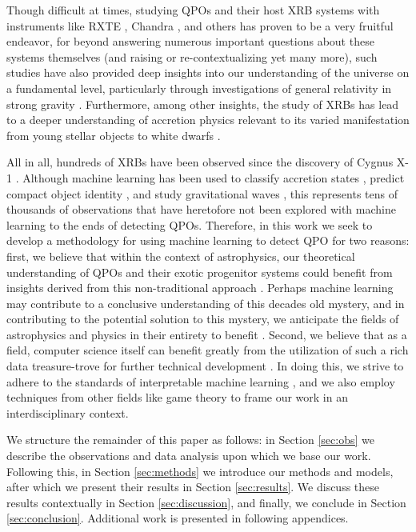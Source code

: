 \documentclass[fleqn,usenatbib]{mnras}
\begin{document}
Though difficult at times, studying QPOs and their host XRB systems with instruments like RXTE \citep{rxte1996}, Chandra \citep{Weisskopf2000}, and others has proven to be a very fruitful endeavor, for beyond answering numerous important questions about these systems themselves (and raising or re-contextualizing yet many more), such studies have also provided deep insights into our understanding of the universe on a fundamental level, particularly through investigations of general relativity in strong gravity \citep{strong_gravity_2004,strong_gravity_2017}. Furthermore, among other insights, the study of XRBs has lead to a deeper understanding of accretion physics relevant to its varied manifestation from young stellar objects to white dwarfs \citep{done_afraid,accretion_connection}. 

All in all, hundreds of XRBs have been observed since the discovery of Cygnus X-1 \citep{bolton1972,lmxbCatalog,blackcat}. Although machine learning has been used to classify accretion states \citep{Sreehari2021}, predict compact object identity \citep{Pattnaik2021}, and study gravitational waves \citep{MLgravWave}, this represents tens of thousands of observations that have heretofore not been explored with machine learning to the ends of detecting QPOs. Therefore, in this work we seek to develop a methodology for using machine learning to detect QPO for two reasons: first, we believe that within the context of astrophysics, our theoretical understanding of QPOs and their exotic progenitor systems could benefit from insights derived from this non-traditional approach \citep{ml_and_theory}. Perhaps machine learning may contribute to a conclusive understanding of this decades old mystery, and in contributing to the potential solution to this mystery, we anticipate the fields of astrophysics and physics in their entirety to benefit \citep{physics_informed_ML_nature,physics_and_ml_again}. Second, we believe that as a field, computer science itself can benefit greatly from the utilization of such a rich data treasure-trove for further technical development  \citep{zhu2016we,big_data_collection_ml}. In doing this, we strive to adhere to the standards of interpretable machine learning \citep{interpretableML,belleInterpretableML,molnar2022}, and we also employ techniques from other fields like game theory to frame our work in an interdisciplinary context. 

We structure the remainder of this paper as follows: in Section \ref{sec:obs} we describe the observations and data analysis upon which we base our work. Following this, in Section \ref{sec:methods} we introduce our methods and models, after which we present their results in Section \ref{sec:results}. We discuss these results contextually in Section \ref{sec:discussion}, and finally, we conclude in Section \ref{sec:conclusion}. Additional work is presented in following appendices. 
\end{document}
